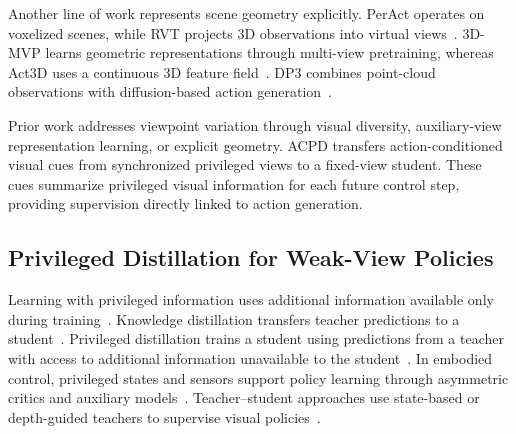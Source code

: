 Another line of work represents scene geometry explicitly. PerAct operates on voxelized scenes, while RVT projects 3D observations into virtual views~\cite{shridhar2023peract,goyal2023rvt}. 3D-MVP learns geometric representations through multi-view pretraining, whereas Act3D uses a continuous 3D feature field~\cite{qian20253dmvp,gervet2023act3d}. DP3 combines point-cloud observations with diffusion-based action generation~\cite{ze2024dp3}.

Prior work addresses viewpoint variation through visual diversity, auxiliary-view representation learning, or explicit geometry. ACPD transfers action-conditioned visual cues from synchronized privileged views to a fixed-view student. These cues summarize privileged visual information for each future control step, providing supervision directly linked to action generation.



\subsection{Privileged Distillation for Weak-View Policies}

Learning with privileged information uses additional information available only during training~\cite{vapnik2015lupi}. Knowledge distillation transfers teacher predictions to a student~\cite{hinton2015distilling}. Privileged distillation trains a student using predictions from a teacher with access to additional information unavailable to the student~\cite{lopezpaz2016generalized}. In embodied control, privileged states and sensors support policy learning through asymmetric critics and auxiliary models~\cite{pinto2018asymmetric,hu2024scaffolder}. Teacher--student approaches use state-based or depth-guided teachers to supervise visual policies~\cite{xu2024humanvla,wang2025monolift}.

